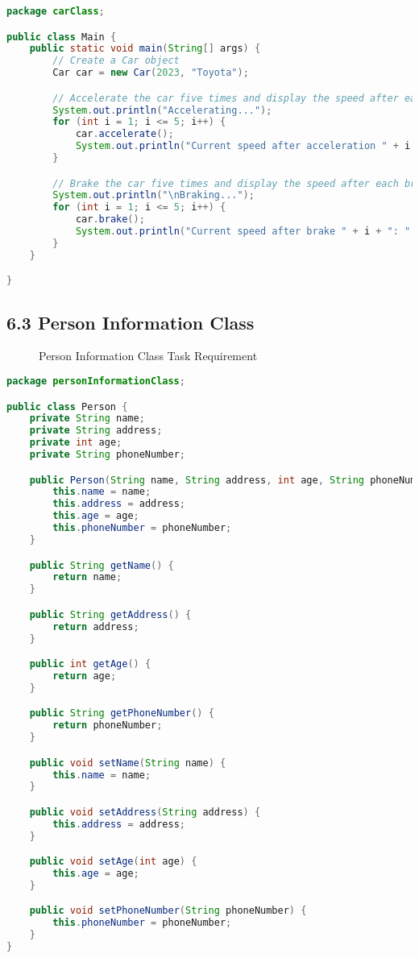 \documentclass{article}
\begin{document}
\begin{lstlisting}[language=Java, caption=Main.java]
package carClass;

public class Main {
    public static void main(String[] args) {
        // Create a Car object
        Car car = new Car(2023, "Toyota");

        // Accelerate the car five times and display the speed after each acceleration
        System.out.println("Accelerating...");
        for (int i = 1; i <= 5; i++) {
            car.accelerate();
            System.out.println("Current speed after acceleration " + i + ": " + car.getSpeed() + " mph");
        }

        // Brake the car five times and display the speed after each brake
        System.out.println("\nBraking...");
        for (int i = 1; i <= 5; i++) {
            car.brake();
            System.out.println("Current speed after brake " + i + ": " + car.getSpeed() + " mph");
        }
    }

}

\end{lstlisting}

\subsection*{6.3 Person Information Class}

\begin{figure}[h]
    \centering
    \caption{Person Information Class Task Requirement}
\end{figure}

\begin{lstlisting}[language=Java, caption=Person.java]
package personInformationClass;

public class Person {
    private String name;
    private String address;
    private int age;
    private String phoneNumber;

    public Person(String name, String address, int age, String phoneNumber) {
        this.name = name;
        this.address = address;
        this.age = age;
        this.phoneNumber = phoneNumber;
    }

    public String getName() {
        return name;
    }

    public String getAddress() {
        return address;
    }

    public int getAge() {
        return age;
    }

    public String getPhoneNumber() {
        return phoneNumber;
    }

    public void setName(String name) {
        this.name = name;
    }

    public void setAddress(String address) {
        this.address = address;
    }

    public void setAge(int age) {
        this.age = age;
    }

    public void setPhoneNumber(String phoneNumber) {
        this.phoneNumber = phoneNumber;
    }
}

\end{lstlisting}
\end{document}
